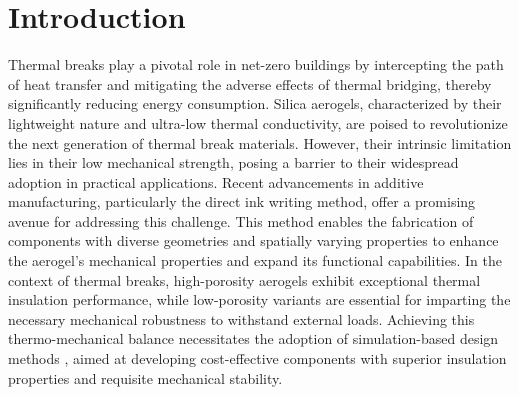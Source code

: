 \documentclass[pdf-a,balance,colorlinks,upint,subscriptcorrection,varvw,mathalfa=cal=boondoxo, spanish,french,vietnamese,russian,greek]{asmeconf}
\begin{document}

\section{Introduction}
\noindent
Thermal breaks play a pivotal role in net-zero buildings by intercepting the path of heat transfer and mitigating the adverse effects of thermal bridging, thereby significantly reducing energy consumption. Silica aerogels, characterized by their lightweight nature and ultra-low thermal conductivity, are poised to revolutionize the next generation of thermal break materials.
However, their intrinsic limitation lies in their low mechanical strength, posing a barrier to their widespread adoption in practical applications. Recent advancements in additive manufacturing, particularly the direct ink writing method, offer a promising avenue for addressing this challenge. This method enables the fabrication of components with diverse geometries and spatially varying properties to enhance the aerogel's mechanical properties and expand its functional capabilities.
In the context of thermal breaks, high-porosity aerogels exhibit exceptional thermal insulation performance, while low-porosity variants are essential for imparting the necessary mechanical robustness to withstand external loads. Achieving this thermo-mechanical balance necessitates the adoption of simulation-based design methods \cite{chen2013weighted,chen2019taylor,chen2021taylor,tan2024scalable}, aimed at developing cost-effective components with superior insulation properties and requisite mechanical stability.
\end{document}
